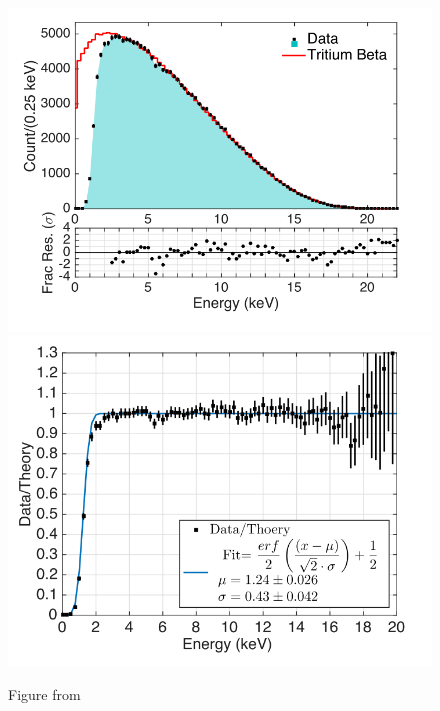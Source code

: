 \begin{figure}[htbp]
\begin{center}
\includegraphics[width=\halffig]{figures/lux/lux_tritium1a.png}
\includegraphics[width=\halffig]{figures/lux/lux_tritium1b.png}
\caption{ Figure from \cite{LUXTritium}}
\label{fig:tritium1}
\end{center}
\end{figure}


